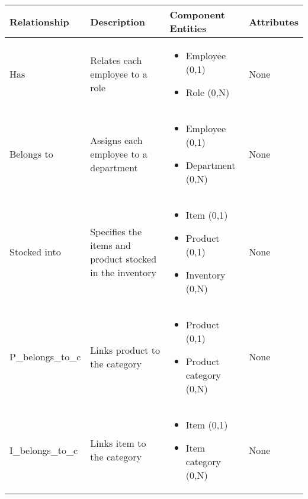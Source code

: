 \begin{longtable}{|p{}|p{} |p{}|p{} |} 
\hline
\textbf{Relationship} & \textbf{Description} & \textbf{Component Entities} & \textbf{Attributes} \\\hline


Has & Relates each employee to a role & \begin{itemize}
        \vspace{-1em}
        \item Employee (0,1)
        \item Role (0,N)
    \end{itemize}
 &  None \\\hline
 
Belongs to & Assigns each employee to a department & \begin{itemize}
        \vspace{-1em}
        \item Employee (0,1)
        \item Department (0,N)
    \end{itemize}
 &  None \\\hline

Stocked into & Specifies the items and product stocked in the inventory & \begin{itemize}
	\vspace{-1em}
	\item Item (0,1)
	\item Product (0,1)
	\item Inventory (0,N)
\end{itemize}
&  None \\\hline

P\_belongs\_to\_c & Links product to the category  & \begin{itemize}
	\vspace{-1em}
	\item Product (0,1)
	\item Product category (0,N)
\end{itemize}
&  None \\\hline

I\_belongs\_to\_c & Links item to the category & \begin{itemize}
	\vspace{-1em}
	\item Item (0,1)
	\item Item category (0,N)
\end{itemize}
&  None \\\hline


\end{longtable}
